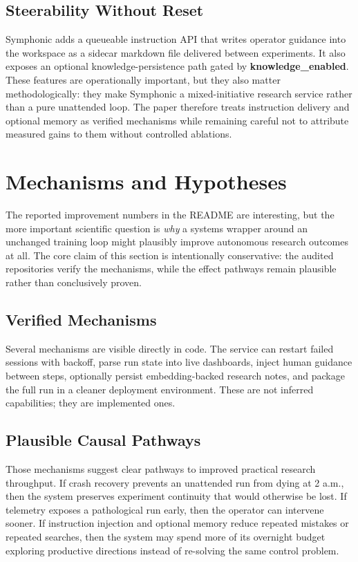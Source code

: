 \documentclass[conference]{IEEEtran}
\newcommand{\file}[1]{{\ttfamily\bfseries\textcolor{accentteal}{#1}}}
\begin{document}
\subsection{Steerability Without Reset}
Symphonic adds a queueable instruction API that writes operator guidance into the workspace as a sidecar markdown file delivered between experiments. It also exposes an optional knowledge-persistence path gated by \file{knowledge\_enabled}. These features are operationally important, but they also matter methodologically: they make Symphonic a mixed-initiative research service rather than a pure unattended loop. The paper therefore treats instruction delivery and optional memory as verified mechanisms while remaining careful not to attribute measured gains to them without controlled ablations.

\section{Mechanisms and Hypotheses}
The reported improvement numbers in the README are interesting, but the more important scientific question is \emph{why} a systems wrapper around an unchanged training loop might plausibly improve autonomous research outcomes at all. The core claim of this section is intentionally conservative: the audited repositories verify the mechanisms, while the effect pathways remain plausible rather than conclusively proven.

\subsection{Verified Mechanisms}
Several mechanisms are visible directly in code. The service can restart failed sessions with backoff, parse run state into live dashboards, inject human guidance between steps, optionally persist embedding-backed research notes, and package the full run in a cleaner deployment environment. These are not inferred capabilities; they are implemented ones.

\subsection{Plausible Causal Pathways}
Those mechanisms suggest clear pathways to improved practical research throughput. If crash recovery prevents an unattended run from dying at 2 a.m., then the system preserves experiment continuity that would otherwise be lost. If telemetry exposes a pathological run early, then the operator can intervene sooner. If instruction injection and optional memory reduce repeated mistakes or repeated searches, then the system may spend more of its overnight budget exploring productive directions instead of re-solving the same control problem.
\end{document}
